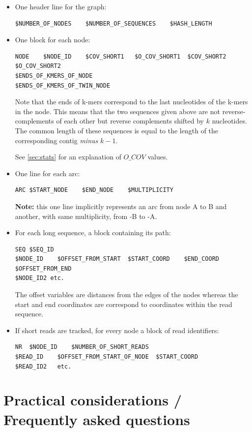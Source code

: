 \documentclass{article}
\begin{document}
\begin{itemize}
\item One header line for the graph: 
\begin{verbatim}
$NUMBER_OF_NODES    $NUMBER_OF_SEQUENCES    $HASH_LENGTH
\end{verbatim}

\item One block for each node:
\begin{verbatim}
NODE    $NODE_ID    $COV_SHORT1   $O_COV_SHORT1  $COV_SHORT2  $O_COV_SHORT2
$ENDS_OF_KMERS_OF_NODE
$ENDS_OF_KMERS_OF_TWIN_NODE
\end{verbatim}

Note that the ends of k-mers correspond to the last nucleotides of the k-mers in the node. This means that the two sequences given above are not reverse-complements of each other but reverse complements shifted by $k$ nucleotides. The common length of these sequences is equal to the length of the corresponding contig \emph{minus} $k-1$.

See \ref{sec:stats} for an explanation of $O\_COV$ values.

\item One line for each arc:
\begin{verbatim}
ARC $START_NODE    $END_NODE    $MULTIPLICITY
\end{verbatim}

\textbf{Note:} this one line implicitly represents an arc from node A to B and another, with same multiplicity, from -B to -A.

\item For each long sequence, a block containing its path:
\begin{verbatim}
SEQ	$SEQ_ID
$NODE_ID	$OFFSET_FROM_START	$START_COORD	$END_COORD	$OFFSET_FROM_END
$NODE_ID2 etc.
\end{verbatim}

The offset variables are distances from the edges of the nodes whereas the start and end coordinates are correspond to coordinates within the read sequence.

\item If short reads are tracked, for every node a block of read identifiers:
\begin{verbatim}
NR	$NODE_ID	$NUMBER_OF_SHORT_READS
$READ_ID	$OFFSET_FROM_START_OF_NODE	$START_COORD
$READ_ID2	etc.
\end{verbatim}
\end{itemize}

\section{Practical considerations / Frequently asked questions} 
\end{document}
